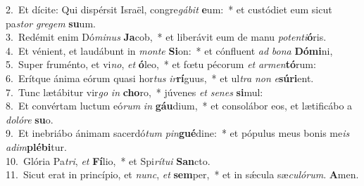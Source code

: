{2.~}Et dícite: Qui dispérsit Israël, congre\textit{gá}\textit{bit} \textbf{e}um:~* et custódiet eum sicut pa\textit{stor} \textit{gre}\textit{gem} \textbf{su}um.\\
{3.~}Redémit enim Dó\textit{mi}\textit{nus} \textbf{Ja}cob,~* et liberávit eum de manu \textit{po}\textit{ten}\textit{ti}\textbf{ó}ris.\\
{4.~}Et vénient, et laudábunt in \textit{mon}\textit{te} \textbf{Si}on:~* et cónfluent \textit{ad} \textit{bo}\textit{na} \textbf{Dó}\textbf{mi}ni,\\
{5.~}Super fruménto, et vi\textit{no}, \textit{et} \textbf{ó}leo,~* et fœtu pécorum \textit{et} \textit{ar}\textit{men}\textbf{tó}rum:\\
{6.~}Erítque ánima eórum quasi hor\textit{tus} \textit{ir}\textbf{rí}guus,~* et ul\textit{tra} \textit{non} \textit{e}\textbf{sú}\textbf{ri}ent.\\
{7.~}Tunc lætábitur vir\textit{go} \textit{in} \textbf{cho}ro,~* júvenes \textit{et} \textit{se}\textit{nes} \textbf{si}mul:\\
{8.~}Et convértam luctum eó\textit{rum} \textit{in} \textbf{gáu}dium,~* et consolábor eos, et lætificábo a \textit{do}\textit{ló}\textit{re} \textbf{su}o.\\
{9.~}Et inebriábo ánimam sacerdó\textit{tum} \textit{pin}\textbf{gué}dine:~* et pópulus meus bonis me\textit{is} \textit{a}\textit{dim}\textbf{plé}\textbf{bi}tur.\\
{10.~}Glória Pa\textit{tri}, \textit{et} \textbf{Fí}lio,~* et Spi\textit{rí}\textit{tu}\textit{i} \textbf{San}cto.\\
{11.~}Sicut erat in princípio, et \textit{nunc}, \textit{et} \textbf{sem}per,~* et in sǽcula sæ\textit{cu}\textit{ló}\textit{rum}. \textbf{A}men.\\
